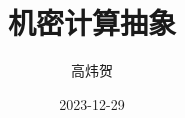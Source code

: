 \documentclass[12pt, letterpaper]{report}
\begin{document}
\title{机密计算抽象}
\author{高炜贺}
\date{2023-12-29}
\maketitle

\newpage




\end{document}
